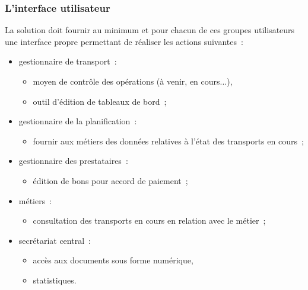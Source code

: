 \subsubsection{L'interface utilisateur}
La solution doit fournir au minimum et pour chacun de ces groupes utilisateurs une interface propre permettant de réaliser les actions suivantes~:
\begin{itemize}
\item gestionnaire de transport~:
	\begin{itemize}
	\item moyen de contrôle des opérations (à venir, en cours...),
	\item outil d'édition de tableaux de bord~;
	\end{itemize}
\item gestionnaire de la planification~:
	\begin{itemize}
	\item fournir aux métiers des données relatives à l'état des transports en cours~;
	\end{itemize}
\item gestionnaire des prestataires~:
	\begin{itemize}
	\item édition de bons pour accord de paiement~;
	\end{itemize}
\item métiers~:
	\begin{itemize}
	\item consultation des transports en cours en relation avec le métier~;
	\end{itemize}
\item secrétariat central~:
	\begin{itemize}
	\item accès aux documents sous forme numérique,
	\item statistiques.
	\end{itemize}
\end{itemize}

